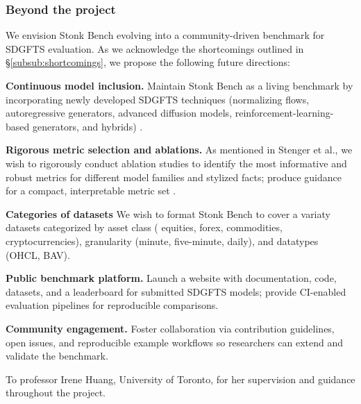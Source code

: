     \subsubsection{Beyond the project} We envision Stonk Bench
    evolving into a community-driven benchmark for SDGFTS evaluation.
    As we acknowledge the shortcomings outlined in
    §\ref{subsub:shortcomings}, we propose the following future
    directions:
    \begin{enumerate}[label=\textbf{[F\arabic*]}, resume]
      \item \textbf{Continuous model inclusion.}
      Maintain Stonk Bench as a living benchmark by incorporating
      newly developed SDGFTS techniques (normalizing flows,
      autoregressive generators, advanced diffusion models,
      reinforcement-learning-based generators, and hybrids)
      \cite{Potluru24}.
      \item \textbf{Rigorous metric selection and ablations.}
      As mentioned in Stenger et al., we wish to rigorously conduct
      ablation studies to identify the most informative and robust
      metrics for different model families and stylized facts;
      produce guidance for a compact, interpretable metric set
      \cite{Stenger24}.
      \item \textbf{Categories of datasets} We wish to format Stonk
      Bench to cover a variaty datasets categorized by asset class (
      equities, forex, commodities, cryptocurrencies), 
      granularity (minute, five-minute, daily), and datatypes (OHCL,
      BAV).
      \item \textbf{Public benchmark platform.}
      Launch a website with documentation, code, datasets, and a
      leaderboard for submitted SDGFTS models; provide CI-enabled
      evaluation pipelines for reproducible comparisons.
      \item \textbf{Community engagement.}
      Foster collaboration via contribution guidelines, open issues,
      and reproducible example workflows so researchers can extend
      and validate the benchmark.
    \end{enumerate}

\begin{acks}
  To professor Irene Huang, University of Toronto, for her
  supervision and guidance throughout the project.
\end{acks}




